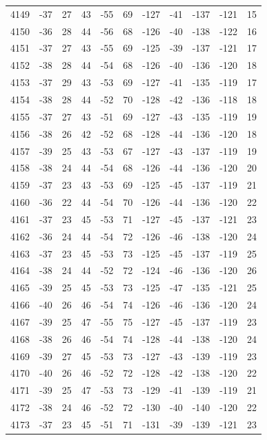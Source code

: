 \begin{table}[H]
\begin{tabular}{lllllllllll}
4149 & -37 & 27 & 43 & -55 & 69 & -127 & -41 & -137 & -121 & 15 \\
4150 & -36 & 28 & 44 & -56 & 68 & -126 & -40 & -138 & -122 & 16 \\
4151 & -37 & 27 & 43 & -55 & 69 & -125 & -39 & -137 & -121 & 17 \\
4152 & -38 & 28 & 44 & -54 & 68 & -126 & -40 & -136 & -120 & 18 \\
4153 & -37 & 29 & 43 & -53 & 69 & -127 & -41 & -135 & -119 & 17 \\
4154 & -38 & 28 & 44 & -52 & 70 & -128 & -42 & -136 & -118 & 18 \\
4155 & -37 & 27 & 43 & -51 & 69 & -127 & -43 & -135 & -119 & 19 \\
4156 & -38 & 26 & 42 & -52 & 68 & -128 & -44 & -136 & -120 & 18 \\
4157 & -39 & 25 & 43 & -53 & 67 & -127 & -43 & -137 & -119 & 19 \\
4158 & -38 & 24 & 44 & -54 & 68 & -126 & -44 & -136 & -120 & 20 \\
4159 & -37 & 23 & 43 & -53 & 69 & -125 & -45 & -137 & -119 & 21 \\
4160 & -36 & 22 & 44 & -54 & 70 & -126 & -44 & -136 & -120 & 22 \\
4161 & -37 & 23 & 45 & -53 & 71 & -127 & -45 & -137 & -121 & 23 \\
4162 & -36 & 24 & 44 & -54 & 72 & -126 & -46 & -138 & -120 & 24 \\
4163 & -37 & 23 & 45 & -53 & 73 & -125 & -45 & -137 & -119 & 25 \\
4164 & -38 & 24 & 44 & -52 & 72 & -124 & -46 & -136 & -120 & 26 \\
4165 & -39 & 25 & 45 & -53 & 73 & -125 & -47 & -135 & -121 & 25 \\
4166 & -40 & 26 & 46 & -54 & 74 & -126 & -46 & -136 & -120 & 24 \\
4167 & -39 & 25 & 47 & -55 & 75 & -127 & -45 & -137 & -119 & 23 \\
4168 & -38 & 26 & 46 & -54 & 74 & -128 & -44 & -138 & -120 & 24 \\
4169 & -39 & 27 & 45 & -53 & 73 & -127 & -43 & -139 & -119 & 23 \\
4170 & -40 & 26 & 46 & -52 & 72 & -128 & -42 & -138 & -120 & 22 \\
4171 & -39 & 25 & 47 & -53 & 73 & -129 & -41 & -139 & -119 & 21 \\
4172 & -38 & 24 & 46 & -52 & 72 & -130 & -40 & -140 & -120 & 22 \\
4173 & -37 & 23 & 45 & -51 & 71 & -131 & -39 & -139 & -121 & 23 \\

\end{tabular}
\end{table}
